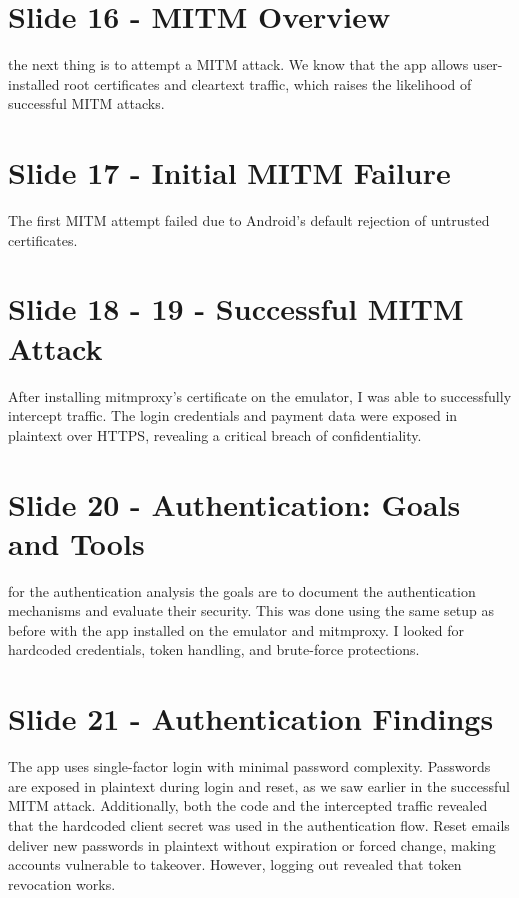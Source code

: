 \documentclass[12pt,a4paper]{article}
\begin{document}
\section*{Slide 16 - MITM Overview}
the next thing is to attempt a MITM attack. We know that the app allows user-installed root certificates and cleartext traffic, which raises the likelihood of successful MITM attacks.

\section*{Slide 17 - Initial MITM Failure}
The first MITM attempt failed due to Android's default rejection of untrusted certificates.

\section*{Slide 18 - 19 - Successful MITM Attack}
After installing mitmproxy's certificate on the emulator, I was able to successfully intercept traffic. The login credentials and payment data were exposed in plaintext over HTTPS, revealing a critical breach of confidentiality.


\section*{Slide 20 - Authentication: Goals and Tools}
for the authentication analysis the goals are to document the authentication mechanisms and evaluate their security. This was done using the same setup as before with the app installed on the emulator and mitmproxy. I looked for hardcoded credentials, token handling, and brute-force protections.

\section*{Slide 21 - Authentication Findings}
The app uses single-factor login with minimal password complexity. Passwords are exposed in plaintext during login and reset, as we saw earlier in the successful MITM attack. Additionally, both the code and the intercepted traffic revealed that the hardcoded client secret was used in the authentication flow. Reset emails deliver new passwords in plaintext without expiration or forced change, making accounts vulnerable to takeover. However, logging out revealed that token revocation works.
\end{document}
